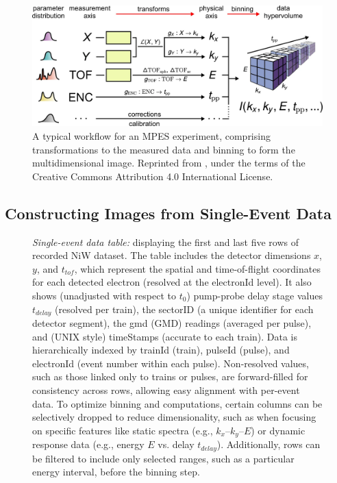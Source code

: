 \begin{figure}[h]
    \centering
    \includegraphics[width=1\linewidth]{images/41597_2020_769_Fig2_HTML.png}
    \caption{A typical workflow for an \gls{MPES} experiment, comprising transformations to the measured data and binning to form the multidimensional image. Reprinted from \cite{xianOpensourceEndtoendWorkflow2020}, under the terms of the Creative Commons Attribution 4.0 International License.}
    \label{fig:mpes_workflow}
\end{figure}

\subsection{Constructing Images from Single-Event Data}

\begin{figure}[h]
    \centering
    \caption{\textit{Single-event data table:} displaying the first and last five rows of recorded \gls{NiW} dataset. The table includes the detector dimensions $x$, $y$, and $t_{tof}$, which represent the spatial and time-of-flight coordinates for each detected electron (resolved at the electronId level). It also shows (unadjusted with respect to $t_0$) pump-probe delay stage values $t_{delay}$ (resolved per train), the sectorID (a unique identifier for each detector segment), the \gls{gmd} (GMD) readings (averaged per pulse), and (UNIX style) timeStamps (accurate to each train). Data is hierarchically indexed by trainId (\gls{train}), pulseId (\gls{pulse}), and electronId (event number within each pulse). Non-resolved values, such as those linked only to trains or pulses, are forward-filled for consistency across rows, allowing easy alignment with per-event data. To optimize binning and computations, certain columns can be selectively dropped to reduce dimensionality, such as when focusing on specific features like static spectra (e.g., $k_x$–$k_y$–$E$) or dynamic response data (e.g., energy $E$ vs. delay $t_{delay}$). Additionally, rows can be filtered to include only selected ranges, such as a particular energy interval, before the binning step.}
    \label{fig:df}
\end{figure}

